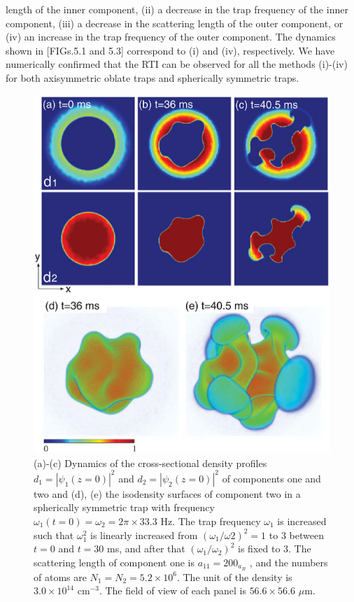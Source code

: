 \documentclass[12pt,a4paper]{report} %
\begin{document}
length of the inner component, (ii) a decrease in the trap
frequency of the inner component, (iii) a decrease in the
scattering length of the outer component, or (iv) an increase
in the trap frequency of the outer component. The dynamics
shown in [FIGs.5.1 and 5.3] correspond to (i) and (iv), respectively.
We have numerically confirmed that the RTI can be observed
for all the methods (i)-(iv) for both axisymmetric oblate traps
and spherically symmetric traps.
\begin{figure}[htbp]
\begin{center}
\includegraphics[scale=0.5,keepaspectratio]{5-3.eps}
\caption{(a)-(c) Dynamics of the cross-sectional
density profiles $d_1 = | \psi_1 (z=0) |^2$ and $d_2 = | \psi_2 (z=0) |^2$ of components
one and two and (d), (e) the isodensity surfaces of component
two in a spherically symmetric trap with frequency $\omega_1(t=0)= \omega_2 = 2 \pi \times 33.3 $ Hz.
The trap frequency $\omega_1$ is increased such that $\omega_1^2$
is linearly increased from $(\omega_1 / \omega2)^2 = 1$ to $3$ between $t=0$ and
$t=30$ ms, and after that $(\omega_1/\omega_2)^2$ is fixed to $3$. The scattering length
of component one is $a_{11} = 200_{a_B}$ , and the numbers of atoms are
$N_1 = N_2 = 5.2 \times 10^6$. The unit of the density is $3.0 \times 10^{14}$ cm$^{-3}$.
The field of view of each panel is $56.6 \times 56.6$ $\mu$m.}
\label{FIG:5-3}
\end{center}
\end{figure}
\end{document}
